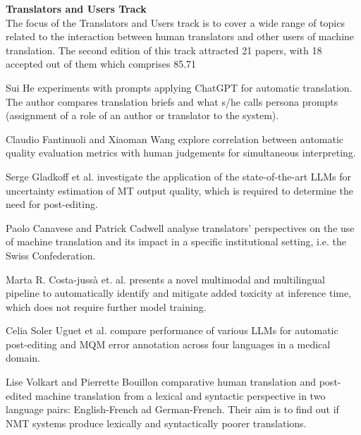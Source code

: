 {\bf Translators and Users Track} \\
The focus of the Translators and Users track is to cover a wide range of topics related to the interaction between human translators and other users of machine translation. The second edition of this track attracted 21 papers, with 18 accepted out of them which comprises 85.71%

Sui He experiments with prompts applying ChatGPT for automatic translation. The author compares translation briefs and what s/he calls persona prompts (assignment of a role of an author or translator to the system). 

Claudio Fantinuoli and Xiaoman Wang explore correlation between automatic quality evaluation metrics with human judgements for simultaneous interpreting. 

Serge Gladkoff et al. investigate the application of the state-of-the-art LLMs for uncertainty estimation of MT output quality, which is required to determine the need for post-editing.

Paolo Canavese and Patrick Cadwell analyse translators’ perspectives on the use of machine translation and its impact in a specific institutional setting, i.e. the Swiss Confederation.
    
Marta R. Costa-jussà et. al. presents a novel multimodal and multilingual pipeline to automatically identify and mitigate added toxicity at inference time, which does not require further model training.

Celia Soler Uguet et al. compare performance of various LLMs for automatic post-editing and MQM error annotation across four languages in a medical domain.

Lise Volkart and Pierrette Bouillon comparative human translation and post-edited machine translation from a lexical and syntactic perspective in two language pairs: English-French ad German-French. Their aim is to find out if NMT systems produce lexically and syntactically poorer translations.

